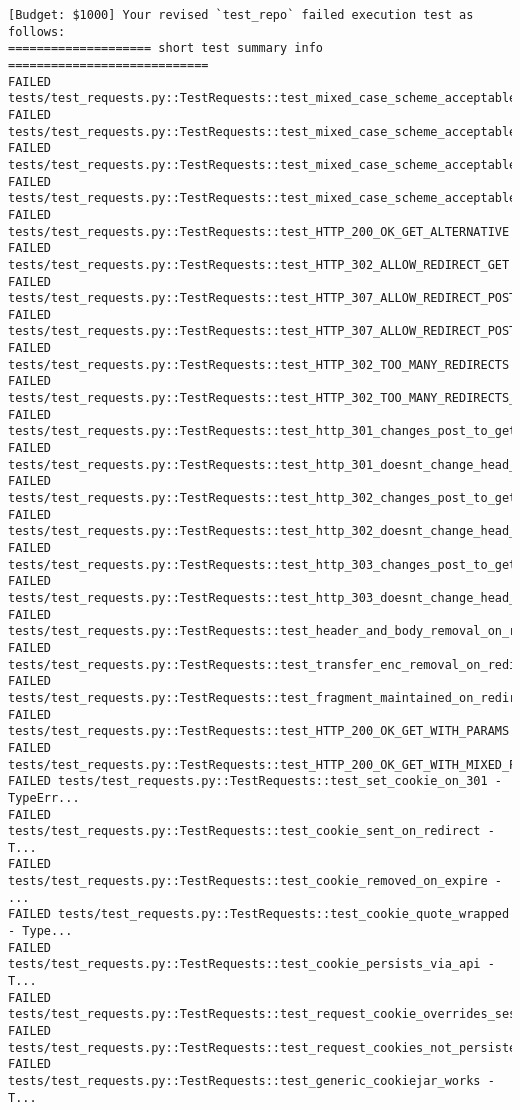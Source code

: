 \begin{Verbatim}[fontsize=\small, breaklines=true, breakanywhere=true]
[Budget: $1000] Your revised `test_repo` failed execution test as follows:
==================== short test summary info ============================
FAILED tests/test_requests.py::TestRequests::test_mixed_case_scheme_acceptable[http://]
FAILED tests/test_requests.py::TestRequests::test_mixed_case_scheme_acceptable[HTTP://]
FAILED tests/test_requests.py::TestRequests::test_mixed_case_scheme_acceptable[hTTp://]
FAILED tests/test_requests.py::TestRequests::test_mixed_case_scheme_acceptable[HttP://]
FAILED tests/test_requests.py::TestRequests::test_HTTP_200_OK_GET_ALTERNATIVE
FAILED tests/test_requests.py::TestRequests::test_HTTP_302_ALLOW_REDIRECT_GET
FAILED tests/test_requests.py::TestRequests::test_HTTP_307_ALLOW_REDIRECT_POST
FAILED tests/test_requests.py::TestRequests::test_HTTP_307_ALLOW_REDIRECT_POST_WITH_SEEKABLE
FAILED tests/test_requests.py::TestRequests::test_HTTP_302_TOO_MANY_REDIRECTS
FAILED tests/test_requests.py::TestRequests::test_HTTP_302_TOO_MANY_REDIRECTS_WITH_PARAMS
FAILED tests/test_requests.py::TestRequests::test_http_301_changes_post_to_get
FAILED tests/test_requests.py::TestRequests::test_http_301_doesnt_change_head_to_get
FAILED tests/test_requests.py::TestRequests::test_http_302_changes_post_to_get
FAILED tests/test_requests.py::TestRequests::test_http_302_doesnt_change_head_to_get
FAILED tests/test_requests.py::TestRequests::test_http_303_changes_post_to_get
FAILED tests/test_requests.py::TestRequests::test_http_303_doesnt_change_head_to_get
FAILED tests/test_requests.py::TestRequests::test_header_and_body_removal_on_redirect
FAILED tests/test_requests.py::TestRequests::test_transfer_enc_removal_on_redirect
FAILED tests/test_requests.py::TestRequests::test_fragment_maintained_on_redirect
FAILED tests/test_requests.py::TestRequests::test_HTTP_200_OK_GET_WITH_PARAMS
FAILED tests/test_requests.py::TestRequests::test_HTTP_200_OK_GET_WITH_MIXED_PARAMS
FAILED tests/test_requests.py::TestRequests::test_set_cookie_on_301 - TypeErr...
FAILED tests/test_requests.py::TestRequests::test_cookie_sent_on_redirect - T...
FAILED tests/test_requests.py::TestRequests::test_cookie_removed_on_expire - ...
FAILED tests/test_requests.py::TestRequests::test_cookie_quote_wrapped - Type...
FAILED tests/test_requests.py::TestRequests::test_cookie_persists_via_api - T...
FAILED tests/test_requests.py::TestRequests::test_request_cookie_overrides_session_cookie
FAILED tests/test_requests.py::TestRequests::test_request_cookies_not_persisted
FAILED tests/test_requests.py::TestRequests::test_generic_cookiejar_works - T...

\end{Verbatim}
